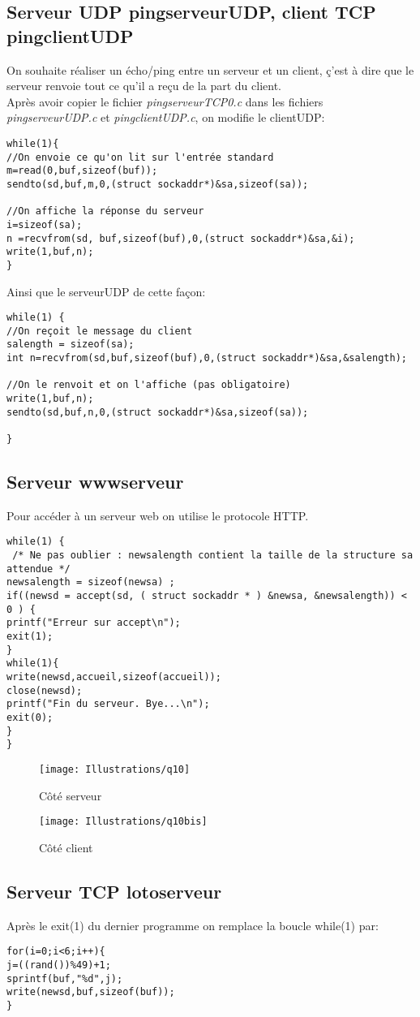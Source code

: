 \documentclass[paper=a4, fontsize=12pt]{article}
\numberwithin{equation}{section}		%
\numberwithin{figure}{section}			%
\numberwithin{table}{section}				%
\begin{document}
\subsection{Serveur UDP pingserveurUDP, client TCP pingclientUDP}
On souhaite réaliser un écho/ping entre un serveur et un client, ç'est à dire que le serveur renvoie tout ce qu'il a reçu de la part du client. 
\\Après avoir copier le fichier \textit{pingserveurTCP0.c} dans les fichiers  \textit{pingserveurUDP.c} et  \textit{pingclientUDP.c}, on modifie le clientUDP:
\begin{verbatim}
while(1){
//On envoie ce qu'on lit sur l'entrée standard
m=read(0,buf,sizeof(buf));
sendto(sd,buf,m,0,(struct sockaddr*)&sa,sizeof(sa));

//On affiche la réponse du serveur
i=sizeof(sa);
n =recvfrom(sd, buf,sizeof(buf),0,(struct sockaddr*)&sa,&i);
write(1,buf,n);
}
\end{verbatim}
Ainsi que le serveurUDP de cette façon:
\begin{verbatim}
while(1) {
//On reçoit le message du client
salength = sizeof(sa);
int n=recvfrom(sd,buf,sizeof(buf),0,(struct sockaddr*)&sa,&salength);

//On le renvoit et on l'affiche (pas obligatoire)
write(1,buf,n);
sendto(sd,buf,n,0,(struct sockaddr*)&sa,sizeof(sa));

}	
\end{verbatim}
\newpage%
\subsection{Serveur wwwserveur}
Pour accéder à un serveur web on utilise le protocole HTTP.
\begin{verbatim}
while(1) {
 /* Ne pas oublier : newsalength contient la taille de la structure sa attendue */
newsalength = sizeof(newsa) ;
if((newsd = accept(sd, ( struct sockaddr * ) &newsa, &newsalength)) < 0 ) {
printf("Erreur sur accept\n");
exit(1);
}
while(1){
write(newsd,accueil,sizeof(accueil));
close(newsd);
printf("Fin du serveur. Bye...\n");
exit(0);
}	
}
\end{verbatim}
\begin{figure}[h!]
\centerline{\texttt{[image: Illustrations/q10]}}
\caption{\label{Illustrations/q10} Côté serveur}
\end{figure}
\begin{figure}[h!]
\centerline{\texttt{[image: Illustrations/q10bis]}}
\caption{\label{Illustrations/q10bis} Côté client}
\end{figure}
\subsection{Serveur TCP lotoserveur}
Après le exit(1) du dernier programme on remplace la boucle while(1) par:
\begin{verbatim}
for(i=0;i<6;i++){
j=((rand())%49)+1;
sprintf(buf,"%d",j);
write(newsd,buf,sizeof(buf));
}
\end{verbatim}
\end{document}
